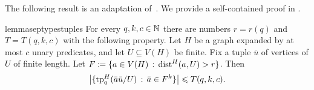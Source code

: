 The following result is an adaptation of~\cite[Corollary~16]{number-of-types}. We provide a self-contained proof in .



\begin{restatable}{lemma}{septypestuples}\label{lem:sep-types-tuple}
    For every $q,k,c\in\mathbb N$ there are numbers $r=r(q)$ and $T=T(q,k,c)$ with the following property. Let $H$ be a graph expanded by at most $c$ unary predicates, and let $U\subseteq V(H)$ be finite. Fix a tuple $\bar u$ of vertices of $U$ of finite length.
    Let $F \coloneqq \{a\in V(H) \,:\, \mathrm{dist}^H(a,U) > r\}$. 
    Then
    \[
      \left|
        \{
        \textnormal{tp}_q^H(\bar a\bar u/U) \,:\, \bar a \in F^k  
        \}
      \right|
      \leqslant
      T(q,k,c).      
    \]
\end{restatable}







